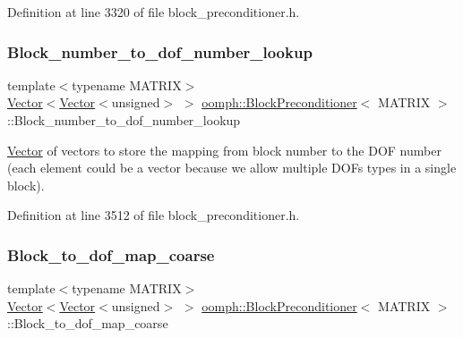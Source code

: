Definition at line 3320 of file block\+\_\+preconditioner.\+h.

\mbox{\label{classoomph_1_1BlockPreconditioner_a61561c20a262195f1bdacda515a2394b}} 
\subsubsection{\texorpdfstring{Block\+\_\+number\+\_\+to\+\_\+dof\+\_\+number\+\_\+lookup}{Block\_number\_to\_dof\_number\_lookup}}
{\footnotesize\ttfamily template$<$typename M\+A\+T\+R\+IX$>$ \\
\hyperlink{classoomph_1_1Vector}{Vector}$<$\hyperlink{classoomph_1_1Vector}{Vector}$<$unsigned$>$ $>$ \hyperlink{classoomph_1_1BlockPreconditioner}{oomph\+::\+Block\+Preconditioner}$<$ M\+A\+T\+R\+IX $>$\+::Block\+\_\+number\+\_\+to\+\_\+dof\+\_\+number\+\_\+lookup\hspace{0.3cm}{\ttfamily [private]}}



\hyperlink{classoomph_1_1Vector}{Vector} of vectors to store the mapping from block number to the D\+OF number (each element could be a vector because we allow multiple D\+O\+Fs types in a single block). 



Definition at line 3512 of file block\+\_\+preconditioner.\+h.

\mbox{\label{classoomph_1_1BlockPreconditioner_ae047d81b8179dfd09b70cf35f40f62ca}} 
\subsubsection{\texorpdfstring{Block\+\_\+to\+\_\+dof\+\_\+map\+\_\+coarse}{Block\_to\_dof\_map\_coarse}}
{\footnotesize\ttfamily template$<$typename M\+A\+T\+R\+IX$>$ \\
\hyperlink{classoomph_1_1Vector}{Vector}$<$\hyperlink{classoomph_1_1Vector}{Vector}$<$unsigned$>$ $>$ \hyperlink{classoomph_1_1BlockPreconditioner}{oomph\+::\+Block\+Preconditioner}$<$ M\+A\+T\+R\+IX $>$\+::Block\+\_\+to\+\_\+dof\+\_\+map\+\_\+coarse\hspace{0.3cm}{\ttfamily [protected]}}



